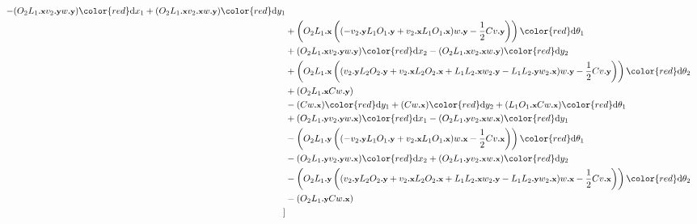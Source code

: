 \documentclass[a4paper,10pt]{article}
\renewcommand{\dx}[1]  {\ensuremath{{\color{red}\text{d}x_{#1}}}}
\renewcommand{\dy}[1]  {\ensuremath{{\color{red}\text{d}y_{#1}}}}
\renewcommand{\dtheta}[1]  {\ensuremath{{\color{red}\text{d}\theta_{#1}}}}
\newcommand{\px}{{\text{\footnotesize\textbf{.x}}}}
\newcommand{\py}{{\text{\footnotesize\textbf{.y}}}}
\begin{document}
\begin{align*}
                                -(O_2L_1\px v_2\py w\py)\dx1
                                +(O_2L_1\px v_2\px w\py)\dy1
                                \\&
                                +\left(O_2L_1\px \left((-v_2\py L_1O_1\py+v_2\px L_1O_1\px)w\py-\frac 12 Cv\py\right)\right)\dtheta1
                                \\&
                                +(O_2L_1\px v_2\py w\py)\dx2
                                -(O_2L_1\px v_2\px w\py)\dy2
                                \\
                                &+\left(O_2L_1\px \left((v_2\py L_2O_2\py+v_2\px L_2O_2\px+L_1L_2\px w_2\py-L_1L_2\py w_2\px)w\py-\frac12 Cv\py\right)\right)\dtheta2\\
                                &+(O_2L_1\px C w\py)
                                \\%
                                &-(Cw\px)\dy1
                                +(Cw\px)\dy2
                                +(L_1O_1\px Cw\px)\dtheta1
                                \\
                                &+(O_2L_1\py v_2\py w\px)\dx1
                                -(O_2L_1\py v_2\px w\px)\dy1\\
                                &-\left(O_2L_1\py\left((-v_2\py L_1O_1\py+v_2\px L_1O_1\px)w\px-\frac 12 C v\px\right)\right)\dtheta1\\
                                &-(O_2L_1\py v_2\py w\px)\dx2
                                +(O_2L_1\py v_2\px w\px)\dy2\\
                                &-\left(O_2L_1\py\left((v_2\py L_2O_2\py+v_2\px L_2O_2\px+L_1L_2\px w_2\py-L_1L_2\py w_2\px)w\px-\frac 12 C v\px\right)\right)\dtheta2
                                \\
                                &-(O_2L_1\py Cw\px)
                                \\  
                        ]&
        \end{align*}

	
	
\end{document}
